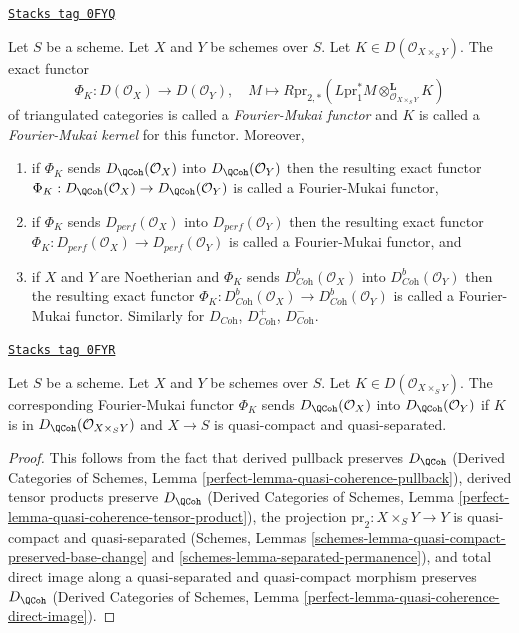 \begin{definition}
\label{equiv-definition-fourier-mukai-functor}
\href{https://stacks.math.columbia.edu/tag/0FYQ}{\texttt{Stacks tag 0FYQ}}

Let $S$ be a scheme. Let $X$ and $Y$ be schemes over $S$.
Let $K \in D(\mathcal{O}_{X \times_S Y})$. The exact functor
$$
\Phi_K : D(\mathcal{O}_X) \longrightarrow D(\mathcal{O}_Y),\quad
M \longmapsto R\text{pr}_{2, *}(
L\text{pr}_1^*M \otimes_{\mathcal{O}_{X \times_S Y}}^\mathbf{L} K)
$$
of triangulated categories is called a {\it Fourier-Mukai functor}
and $K$ is called a {\it Fourier-Mukai kernel} for this functor.
Moreover,
\begin{enumerate}
\item if $\Phi_K$ sends $D_\QCoh(\mathcal{O}_X)$ into $D_\QCoh(\mathcal{O}_Y)$
then the resulting exact functor
$\Phi_K : D_\QCoh(\mathcal{O}_X) \to D_\QCoh(\mathcal{O}_Y)$
is called a Fourier-Mukai functor,
\item if $\Phi_K$ sends $D_{perf}(\mathcal{O}_X)$ into
$D_{perf}(\mathcal{O}_Y)$ then the resulting exact functor
$\Phi_K : D_{perf}(\mathcal{O}_X) \to D_{perf}(\mathcal{O}_Y)$
is called a Fourier-Mukai functor, and
\item if $X$ and $Y$ are Noetherian and $\Phi_K$ sends
$D^b_{\textit{Coh}}(\mathcal{O}_X)$ into $D^b_{\textit{Coh}}(\mathcal{O}_Y)$
then the resulting exact functor
$\Phi_K : D^b_{\textit{Coh}}(\mathcal{O}_X) \to
D^b_{\textit{Coh}}(\mathcal{O}_Y)$
is called a Fourier-Mukai functor.
Similarly for $D_{\textit{Coh}}$, $D^+_{\textit{Coh}}$, $D^-_{\textit{Coh}}$.
\end{enumerate}
\end{definition}

\begin{lemma}
\label{equiv-lemma-fourier-Mukai-QCoh}
\href{https://stacks.math.columbia.edu/tag/0FYR}{\texttt{Stacks tag 0FYR}}

Let $S$ be a scheme. Let $X$ and $Y$ be schemes over $S$.
Let $K \in D(\mathcal{O}_{X \times_S Y})$.
The corresponding Fourier-Mukai functor $\Phi_K$ sends
$D_\QCoh(\mathcal{O}_X)$ into $D_\QCoh(\mathcal{O}_Y)$
if $K$ is in $D_\QCoh(\mathcal{O}_{X \times_S Y})$ and $X \to S$ is
quasi-compact and quasi-separated.
\end{lemma}

\begin{proof}
This follows from the fact that derived pullback preserves
$D_\QCoh$
(Derived Categories of Schemes, Lemma
\ref{perfect-lemma-quasi-coherence-pullback}),
derived tensor products preserve $D_\QCoh$
(Derived Categories of Schemes, Lemma
\ref{perfect-lemma-quasi-coherence-tensor-product}),
the projection $\text{pr}_2 : X \times_S Y \to Y$ is
quasi-compact and quasi-separated
(Schemes, Lemmas
\ref{schemes-lemma-quasi-compact-preserved-base-change} and
\ref{schemes-lemma-separated-permanence}), and
total direct image along a quasi-separated and quasi-compact
morphism preserves $D_\QCoh$
(Derived Categories of Schemes, Lemma
\ref{perfect-lemma-quasi-coherence-direct-image}).
\end{proof}

